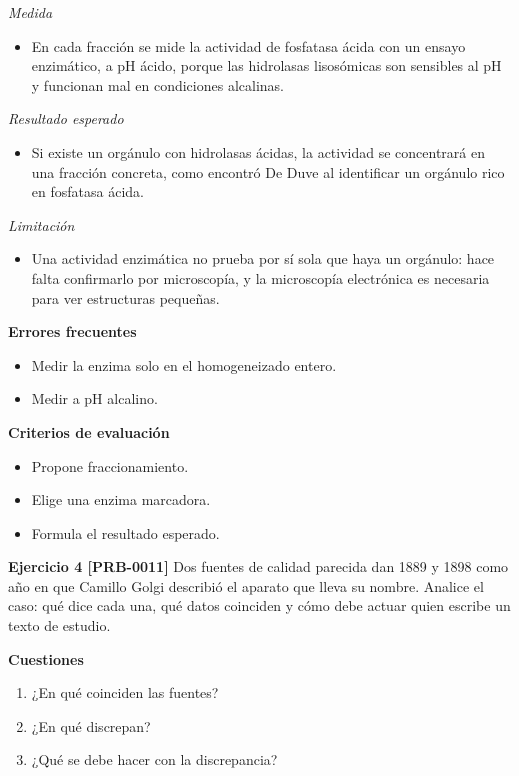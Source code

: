 \documentclass{book}
\begin{document}
\noindent\textit{Medida}
\begin{itemize}
\item En cada fracción se mide la actividad de fosfatasa ácida con un ensayo enzimático, a pH ácido, porque las hidrolasas lisosómicas son sensibles al pH y funcionan mal en condiciones alcalinas.
\end{itemize}

\noindent\textit{Resultado esperado}
\begin{itemize}
\item Si existe un orgánulo con hidrolasas ácidas, la actividad se concentrará en una fracción concreta, como encontró De Duve al identificar un orgánulo rico en fosfatasa ácida.
\end{itemize}

\noindent\textit{Limitación}
\begin{itemize}
\item Una actividad enzimática no prueba por sí sola que haya un orgánulo: hace falta confirmarlo por microscopía, y la microscopía electrónica es necesaria para ver estructuras pequeñas.
\end{itemize}

\noindent\textbf{Errores frecuentes}
\begin{itemize}
\item Medir la enzima solo en el homogeneizado entero.
\item Medir a pH alcalino.
\end{itemize}

\noindent\textbf{Criterios de evaluación}
\begin{itemize}
\item Propone fraccionamiento.
\item Elige una enzima marcadora.
\item Formula el resultado esperado.
\end{itemize}

\noindent\textbf{Ejercicio 4 [PRB-0011]}
Dos fuentes de calidad parecida dan 1889 y 1898 como año en que Camillo Golgi describió el aparato que lleva su nombre. Analice el caso: qué dice cada una, qué datos coinciden y cómo debe actuar quien escribe un texto de estudio.


\noindent\textbf{Cuestiones}
\begin{enumerate}
\item ¿En qué coinciden las fuentes?
\item ¿En qué discrepan?
\item ¿Qué se debe hacer con la discrepancia?
\end{enumerate}
\end{document}
